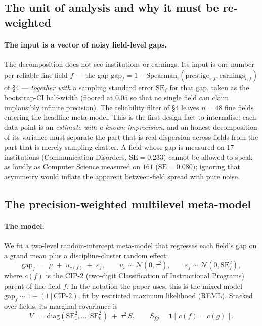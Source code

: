 \documentclass[11pt]{article}
\begin{document}
\subsection{The unit of analysis and why it must be re-weighted}

\paragraph{The input is a vector of noisy field-level gaps.} The decomposition does not see institutions or earnings. Its input is one number per reliable fine field $f$ --- the gap $\mathrm{gap}_f = 1 - \mathrm{Spearman}_i(\text{prestige}_{i,f}, \text{earnings}_{i,f})$ of \S4 --- \emph{together with} a sampling standard error $\mathrm{SE}_f$ for that gap, taken as the bootstrap-CI half-width (floored at $0.05$ so that no single field can claim implausibly infinite precision). The reliability filter of \S4 leaves $n=48$ fine fields entering the headline meta-model. This is the first design fact to internalise: each data point is an \emph{estimate with a known imprecision}, and an honest decomposition of its variance must separate the part that is real dispersion across fields from the part that is merely sampling chatter. A field whose gap is measured on $17$ institutions (Communication Disorders, $\mathrm{SE}=0.233$) cannot be allowed to speak as loudly as Computer Science measured on $161$ ($\mathrm{SE}=0.080$); ignoring that asymmetry would inflate the apparent between-field spread with pure noise.

\subsection{The precision-weighted multilevel meta-model}

\paragraph{The model.} We fit a two-level random-intercept meta-model that regresses each field's gap on a grand mean plus a discipline-cluster random effect:
\[
\mathrm{gap}_f \;=\; \mu \;+\; u_{c(f)} \;+\; \varepsilon_f,
\qquad
u_{c}\sim\mathcal{N}(0,\tau^2),
\qquad
\varepsilon_f\sim\mathcal{N}(0,\mathrm{SE}_f^2),
\]
where $c(f)$ is the CIP-2 (two-digit Classification of Instructional Programs) parent of fine field $f$. In the notation the paper uses, this is the mixed model $\mathrm{gap}_f \sim 1 + (1\,|\,\text{CIP-2})$, fit by restricted maximum likelihood (REML). Stacked over fields, its marginal covariance is
\[
V \;=\; \mathrm{diag}\!\left(\mathrm{SE}_1^2,\dots,\mathrm{SE}_n^2\right) \;+\; \tau^2\,S,
\qquad
S_{fg}=\mathbf{1}\!\left[\,c(f)=c(g)\,\right].
\]
\end{document}

